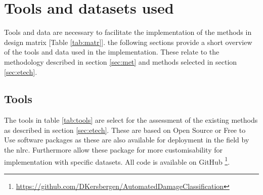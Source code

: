 \section{Tools and datasets used} \label{tool}
Tools and data are necessary to facilitate the implementation of the methods in design matrix [Table \ref{tab:matr}]. the following sections provide a short overview of the tools and data used in the implementation. These relate to the methodology described in section \ref{sec:met} and methods selected in section \ref{sec:etech}.

\subsection{Tools}
The tools in table \ref{tab:tools} are select for the assessment of the existing methods as described in section \ref{sec:etech}. These are based on Open Source or Free to Use software packages as these are also available for deployment in the field by the \ac{nlrc}. Furthermore allow these package for more customisability for implementation with specific datasets. All code is available on GitHub \footnote{\url{https://github.com/DKersbergen/AutomatedDamageClassification}}. \\


